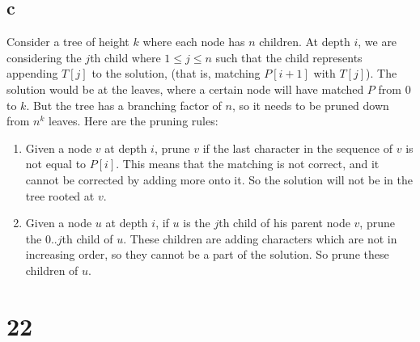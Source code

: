 \documentclass[letterpaper,notitlepage,twoside]{article}
\begin{document}
\subsection*{c}
Consider a tree of height $k$ where each node has $n$ children. At depth $i$, we are considering the $j$th child where $1 \leq j \leq n$  such that the child represents appending $T[j]$ to the solution, (that is, matching $P[i + 1]$ with $T[j]$). The solution would be at the leaves, where a certain node will have matched $P$ from $0$ to $k$. But the tree has a branching factor of $n$, so it needs to be pruned down from $n^k$ leaves. Here are the pruning rules:
\begin{enumerate}
\item Given a node $v$ at depth $i$, prune $v$ if the last character in the sequence of $v$ is not equal to $P[i]$. This means that the matching is not correct, and it cannot be corrected by adding more onto it. So the solution will not be in the tree rooted at $v$.
\item Given a node $u$ at depth $i$, if $u$ is the $j$th child of his parent node $v$, prune the $0..j$th child of $u$. These children are adding characters which are not in increasing order, so they cannot be a part of the solution. So prune these children of $u$.
\end{enumerate}

\section*{22}
\end{document}
